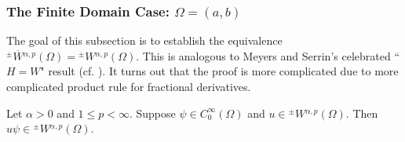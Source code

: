 \documentclass[leqno,final]{siamltex}
\numberwithin{equation}{section}
\renewcommand{\(}{\bigl(}
\renewcommand{\)}{\bigr)}
\begin{document}
    
    
        \subsubsection{\bf The Finite Domain Case: $\Omega=(a,b)$}\label{sec-4.1.1}
        The goal of this subsection is to establish the equivalence  
         ${^{\pm}}{\overline{W}}{^{\alpha,p}}(\Omega) = {^{\pm}}{W}{^{\alpha, p}} (\Omega)$. 
         This is analogous to Meyers and Serrin's celebrated  ``$H = W$" result (cf. \cite{Adams, Evans, Meyers}). 
         It turns out that the proof is more complicated 
         due to more complicated product rule for fractional derivatives.

    \begin{lemma}
        Let $ \alpha >0$ and $1 \leq p <\infty$. Suppose  $\psi \in C^{\infty}_{0}(\Omega)$ and $u \in {^{\pm}}{W}{^{\alpha,p}}(\Omega)$. Then $u \psi \in {^{\pm}}{W}{^{\alpha,p}}(\Omega)$.
    \end{lemma}
\end{document}
